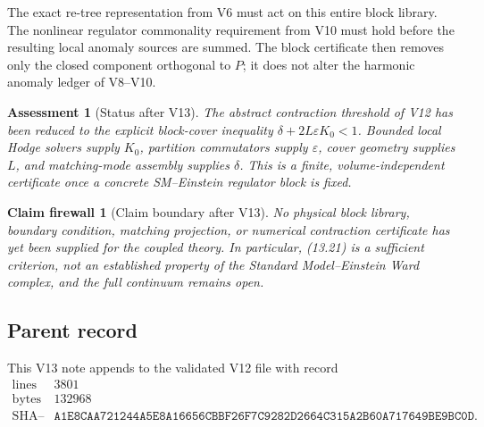 \documentclass[11pt]{article}
\newtheorem{firewall}[theorem]{Claim firewall}
\newtheorem{assessment}[theorem]{Assessment}
\theoremstyle{remark}
\begin{document}
The exact re-tree representation from V6 must act on this entire
block library.  The nonlinear regulator commonality requirement from
V10 must hold before the resulting local anomaly sources are summed.
The block certificate then removes only the closed component
orthogonal to \(P\); it does not alter the harmonic anomaly ledger of
V8--V10.

\begin{assessment}[Status after V13]
\label{ass:v12v13-status}
The abstract contraction threshold of V12 has been reduced to the
explicit block-cover inequality
\(\delta+2L\varepsilon K_0<1\).  Bounded local Hodge solvers supply
\(K_0\), partition commutators supply \(\varepsilon\), cover geometry
supplies \(L\), and matching-mode assembly supplies \(\delta\).
This is a finite, volume-independent certificate once a concrete
SM--Einstein regulator block is fixed.
\end{assessment}

\begin{firewall}[Claim boundary after V13]
\label{fire:v12v13-claim}
No physical block library, boundary condition, matching projection,
or numerical contraction certificate has yet been supplied for the
coupled theory.  In particular, (13.21) is a sufficient criterion,
not an established property of the Standard Model--Einstein Ward
complex, and the full continuum remains open.
\end{firewall}

\subsection{Parent record}

This V13 note appends to the validated V12 file with record
\[
\begin{array}{c|c}
\text{lines}&3801\\
\text{bytes}&132968\\
\text{SHA--256}&
\texttt{A1E8CAA721244A5E8A16656CBBF26F7C9282D2664C315A2B60A717649BE9BC0D}.
\end{array}
\]

\end{document}
